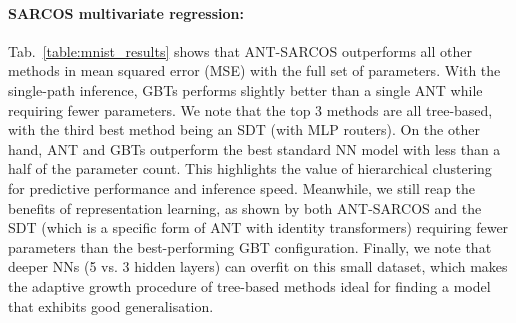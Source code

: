 \paragraph{SARCOS multivariate regression:} Tab.~\ref{table:mnist_results} shows that ANT-SARCOS outperforms all other methods in mean squared error (MSE) with the full set of parameters. With the single-path inference, GBTs performs slightly better than a single ANT while requiring fewer parameters. We note that the top 3 methods are all tree-based, with the third best method being an SDT (with MLP routers). On the other hand, ANT and GBTs outperform the best standard NN model with less than a half of the parameter count. This highlights the value of hierarchical clustering for predictive performance and inference speed. Meanwhile, we still reap the benefits of representation learning, as shown by both ANT-SARCOS and the SDT (which is a specific form of ANT with identity transformers) requiring fewer parameters than the best-performing GBT configuration. Finally, we note that deeper NNs (5 vs. 3 hidden layers) can overfit on this small dataset, which makes the adaptive growth procedure of tree-based methods ideal for finding a model that exhibits good generalisation. 




